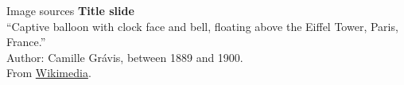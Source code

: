 \documentclass[handout,aspectratio=169]{beamer}
\begin{document}
\backupbegin

\begin{frame}[noframenumbering]{Image sources}
	\small
	\textbf{Title slide}\\\enquote{Captive balloon with clock face and bell, floating above the Eiffel Tower, Paris, France.}\\Author: Camille Grávis, between 1889 and 1900.\\From \href{https://commons.wikimedia.org/wiki/File:Camille_Gr\%C3\%A1vis,_Captive_balloon_with_clock_face_and_bell,_floating_above_the_Eiffel_Tower,_Paris,_France.jpg}{Wikimedia}.
\end{frame}


\backupend
\end{document}
